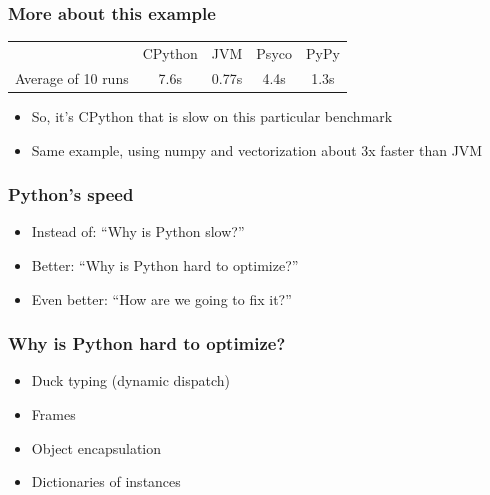 \documentclass[utf8x]{beamer}
\begin{document}
\begin{frame}
  \frametitle{More about this example}
  \begin{tabular}{| l | c | c | c | c |}
    \hline
    & CPython & JVM & Psyco & PyPy \\
    Average of 10 runs & 7.6s & 0.77s & 4.4s & 1.3s \\
    \hline
  \end{tabular}
  \vspace{.5cm}
  \pause
  \begin{itemize}
    \item So, it's CPython that is slow on this particular benchmark
      \pause
    \item Same example, using numpy and vectorization about 3x faster than JVM
  \end{itemize}
\end{frame}

\begin{frame}
  \frametitle{Python's speed}
  \begin{itemize}
    \item Instead of: ``Why is Python slow?''
      \pause
    \item Better: ``Why is Python hard to optimize?''
      \pause
    \item Even better: ``How are we going to fix it?''
  \end{itemize}
\end{frame}

\begin{frame}
  \frametitle{Why is Python hard to optimize?}
  \begin{itemize}
    \item Duck typing (dynamic dispatch)
    \item Frames
    \item Object encapsulation
    \item Dictionaries of instances
  \end{itemize}
\end{frame}

\begin{frame}
\end{frame}
\end{document}
